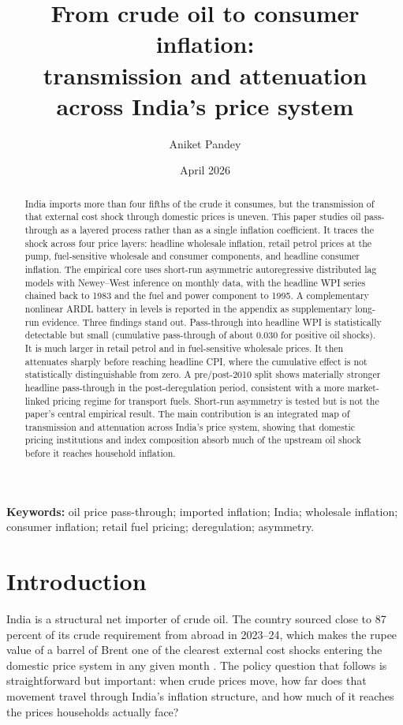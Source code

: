 \documentclass[11pt,a4paper]{article}
\title{\bfseries From crude oil to consumer inflation:\\ transmission and attenuation across India's price system}
\author{Aniket Pandey}
\date{April 2026}
\begin{document}
\maketitle

\begin{abstract}
\noindent India imports more than four fifths of the crude it consumes, but the transmission of that external cost shock through domestic prices is uneven. This paper studies oil pass-through as a layered process rather than as a single inflation coefficient. It traces the shock across four price layers: headline wholesale inflation, retail petrol prices at the pump, fuel-sensitive wholesale and consumer components, and headline consumer inflation. The empirical core uses short-run asymmetric autoregressive distributed lag models with Newey--West inference on monthly data, with the headline WPI series chained back to 1983 and the fuel and power component to 1995. A complementary nonlinear ARDL battery in levels is reported in the appendix as supplementary long-run evidence. Three findings stand out. Pass-through into headline WPI is statistically detectable but small (cumulative pass-through of about 0.030 for positive oil shocks). It is much larger in retail petrol and in fuel-sensitive wholesale prices. It then attenuates sharply before reaching headline CPI, where the cumulative effect is not statistically distinguishable from zero. A pre/post-2010 split shows materially stronger headline pass-through in the post-deregulation period, consistent with a more market-linked pricing regime for transport fuels. Short-run asymmetry is tested but is not the paper's central empirical result. The main contribution is an integrated map of transmission and attenuation across India's price system, showing that domestic pricing institutions and index composition absorb much of the upstream oil shock before it reaches household inflation.
\end{abstract}

\noindent\textbf{Keywords:} oil price pass-through; imported inflation; India; wholesale inflation; consumer inflation; retail fuel pricing; deregulation; asymmetry.

\bigskip

\section{Introduction}
\label{sec:intro}

India is a structural net importer of crude oil. The country sourced close to 87 percent of its crude requirement from abroad in 2023--24, which makes the rupee value of a barrel of Brent one of the clearest external cost shocks entering the domestic price system in any given month \citep{ppac2024}. The policy question that follows is straightforward but important: when crude prices move, how far does that movement travel through India's inflation structure, and how much of it reaches the prices households actually face?
\end{document}
